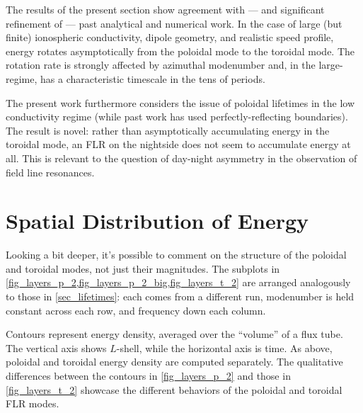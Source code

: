 The results of the present section show agreement with --- and significant refinement of --- past analytical and numerical work. In the case of large (but finite) ionospheric conductivity, dipole geometry, and realistic \Alfven speed profile, energy rotates asymptotically from the poloidal mode to the toroidal mode. The rotation rate is strongly affected by azimuthal modenumber and, in the large-\azm regime, has a characteristic timescale in the tens of periods. 


The present work furthermore considers the issue of poloidal lifetimes in the low conductivity regime (while past work has used perfectly-reflecting boundaries). The result is novel: rather than asymptotically accumulating energy in the toroidal mode, an FLR on the nightside does not seem to accumulate energy at all. This is relevant to the question of day-night asymmetry in the observation of field line resonances. 

\section{Spatial Distribution of Energy}
  \label{sec_layers}


Looking a bit deeper, it's possible to comment on the structure of the poloidal and toroidal modes, not just their magnitudes. The subplots in \cref{fig_layers_p_2,fig_layers_p_2_big,fig_layers_t_2} are arranged analogously to those in \cref{sec_lifetimes}: each comes from a different run, modenumber is held constant across each row, and frequency down each column. 

Contours represent energy density, averaged over the ``volume'' of a flux tube. The vertical axis shows $L$-shell, while the horizontal axis is time. As above, poloidal and toroidal energy density are computed separately. The qualitative differences between the contours in \cref{fig_layers_p_2} and those in \cref{fig_layers_t_2} showcase the different behaviors of the poloidal and toroidal FLR modes. 

